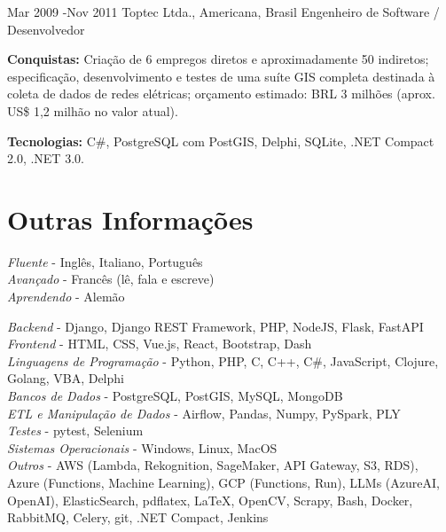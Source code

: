 \documentclass[10pt]{article} %
\begin{document}
\job
{Mar 2009 -}{Nov 2011}
{Toptec Ltda., Americana, Brasil}
{}
{Engenheiro de Software / Desenvolvedor}
{\rule{0mm}{2mm}\textbf{Conquistas:} Criação de 6 empregos diretos e aproximadamente 50 indiretos; especificação, desenvolvimento e testes de uma suíte GIS completa destinada à coleta de dados de redes elétricas; orçamento estimado: BRL 3 milhões (aprox. US\$ 1,2 milhão no valor atual).\\
\rule{0mm}{3mm}\textbf{Tecnologias:} C\#, PostgreSQL com PostGIS, Delphi, SQLite, .NET Compact 2.0, .NET 3.0.}



\section{Outras Informações}

{
\textit{Fluente} - Inglês, Italiano, Português\\
\textit{Avançado} - Francês (lê, fala e escreve)\\
\textit{Aprendendo} - Alemão\\
}


{
\textit{Backend} - Django, Django REST Framework, PHP, NodeJS, Flask, FastAPI\\
\textit{Frontend} - HTML, CSS, Vue.js, React, Bootstrap, Dash\\
\textit{Linguagens de Programação} - Python, PHP, C, C++, C\#, JavaScript, Clojure, Golang, VBA, Delphi\\
\textit{Bancos de Dados} - PostgreSQL, PostGIS, MySQL, MongoDB\\
\textit{ETL e Manipulação de Dados} - Airflow, Pandas, Numpy, PySpark, PLY\\
\textit{Testes} - pytest, Selenium\\
\textit{Sistemas Operacionais} - Windows, Linux, MacOS\\
\textit{Outros} - AWS (Lambda, Rekognition, SageMaker, API Gateway, S3, RDS), Azure (Functions, Machine Learning), GCP (Functions, Run), LLMs (AzureAI, OpenAI), ElasticSearch, pdflatex, LaTeX, OpenCV, Scrapy, Bash, Docker, RabbitMQ, Celery, git, .NET Compact, Jenkins\\
}
\end{document}
